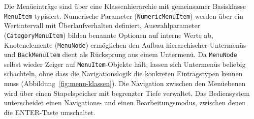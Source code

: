 Die Menüeinträge sind über eine Klassenhierarchie mit gemeinsamer
Basisklasse \texttt{MenuItem} typisiert. Numerische Parameter
(\texttt{NumericMenuItem}) werden über ein Wertintervall mit
Überlaufverhalten definiert, Auswahlparameter
(\texttt{CategoryMenuItem}) bilden benannte Optionen auf interne Werte
ab, Knotenelemente (\texttt{MenuNode}) ermöglichen den Aufbau
hierarchischer Untermenüs und \texttt{BackMenuItem} dient als Rücksprung
aus einem Untermenü. Da \texttt{MenuNode} selbst wieder Zeiger auf
\texttt{MenuItem}-Objekte hält, lassen sich Untermenüs beliebig
schachteln, ohne dass die Navigationslogik die konkreten Eintragstypen
kennen muss (Abbildung~\ref{fig:menu-klassen}). Die Navigation zwischen
den Menüebenen wird über einen Stapelspeicher mit begrenzter Tiefe
verwaltet. Das Bediensystem unterscheidet einen Navigations- und einen
Bearbeitungsmodus, zwischen denen die ENTER-Taste umschaltet.

